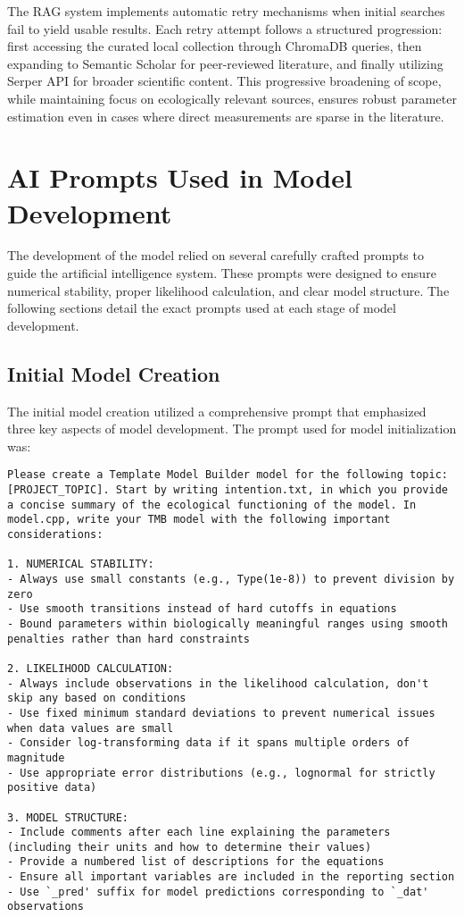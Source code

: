 The RAG system implements automatic retry mechanisms when initial searches fail to yield usable results. Each retry attempt follows a structured progression: first accessing the curated local collection through ChromaDB queries, then expanding to Semantic Scholar for peer-reviewed literature, and finally utilizing Serper API for broader scientific content. This progressive broadening of scope, while maintaining focus on ecologically relevant sources, ensures robust parameter estimation even in cases where direct measurements are sparse in the literature.

\section{AI Prompts Used in Model Development}
\label{sec:ai_prompts}

The development of the model relied on several carefully crafted prompts to guide the artificial intelligence system. These prompts were designed to ensure numerical stability, proper likelihood calculation, and clear model structure. The following sections detail the exact prompts used at each stage of model development.

\subsection{Initial Model Creation}
\label{subsec:initial_model_prompt}

The initial model creation utilized a comprehensive prompt that emphasized three key aspects of model development. The prompt used for model initialization was:

\begin{lstlisting}
Please create a Template Model Builder model for the following topic:[PROJECT_TOPIC]. Start by writing intention.txt, in which you provide a concise summary of the ecological functioning of the model. In model.cpp, write your TMB model with the following important considerations:

1. NUMERICAL STABILITY:
- Always use small constants (e.g., Type(1e-8)) to prevent division by zero
- Use smooth transitions instead of hard cutoffs in equations
- Bound parameters within biologically meaningful ranges using smooth penalties rather than hard constraints

2. LIKELIHOOD CALCULATION:
- Always include observations in the likelihood calculation, don't skip any based on conditions
- Use fixed minimum standard deviations to prevent numerical issues when data values are small
- Consider log-transforming data if it spans multiple orders of magnitude
- Use appropriate error distributions (e.g., lognormal for strictly positive data)

3. MODEL STRUCTURE:
- Include comments after each line explaining the parameters (including their units and how to determine their values)
- Provide a numbered list of descriptions for the equations
- Ensure all important variables are included in the reporting section
- Use `_pred' suffix for model predictions corresponding to `_dat' observations
\end{lstlisting}

